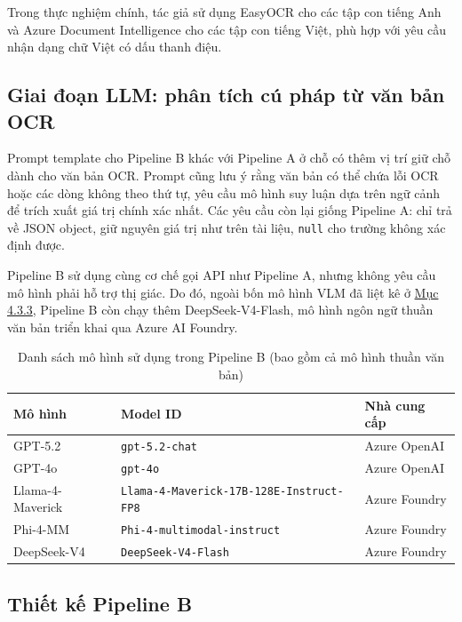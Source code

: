 ﻿\documentclass[12pt]{report}
\begin{document}
Trong thực nghiệm chính, tác giả sử dụng EasyOCR cho các tập con tiếng Anh và Azure Document Intelligence cho các tập con tiếng Việt, phù hợp với yêu cầu nhận dạng chữ Việt có dấu thanh điệu.

\subsection{Giai đoạn LLM: phân tích cú pháp từ văn bản OCR}\label{sec:llm_parsing}

Prompt template cho Pipeline B khác với Pipeline A ở chỗ có thêm vị trí giữ chỗ dành cho văn bản OCR. Prompt cũng lưu ý rằng văn bản có thể chứa lỗi OCR hoặc các dòng không theo thứ tự, yêu cầu mô hình suy luận dựa trên ngữ cảnh để trích xuất giá trị chính xác nhất. Các yêu cầu còn lại giống Pipeline A: chỉ trả về JSON object, giữ nguyên giá trị như trên tài liệu, \texttt{null} cho trường không xác định được.

Pipeline B sử dụng cùng cơ chế gọi API như Pipeline A, nhưng không yêu cầu mô hình phải hỗ trợ thị giác. Do đó, ngoài bốn mô hình VLM đã liệt kê ở \hyperref[sec:vlm_models]{Mục 4.3.3}, Pipeline B còn chạy thêm DeepSeek-V4-Flash, mô hình ngôn ngữ thuần văn bản triển khai qua Azure AI Foundry.

\begin{table}[h]
\centering
\caption{Danh sách mô hình sử dụng trong Pipeline B (bao gồm cả mô hình thuần văn bản)}
\label{tab:models_pipeline_b}
\begin{tabular}{|l|l|l|}
\hline
\textbf{Mô hình} & \textbf{Model ID} & \textbf{Nhà cung cấp} \\ \hline
GPT-5.2          & \texttt{gpt-5.2-chat}                             & Azure OpenAI  \\ \hline
GPT-4o           & \texttt{gpt-4o}                                   & Azure OpenAI  \\ \hline
Llama-4-Maverick & \texttt{Llama-4-Maverick-17B-128E-Instruct-FP8}   & Azure Foundry \\ \hline
Phi-4-MM         & \texttt{Phi-4-multimodal-instruct}                & Azure Foundry \\ \hline
DeepSeek-V4      & \texttt{DeepSeek-V4-Flash}                        & Azure Foundry \\ \hline
\end{tabular}
\end{table}

\subsection{Thiết kế Pipeline B}\label{sec:ocr_llm_design}
\end{document}
